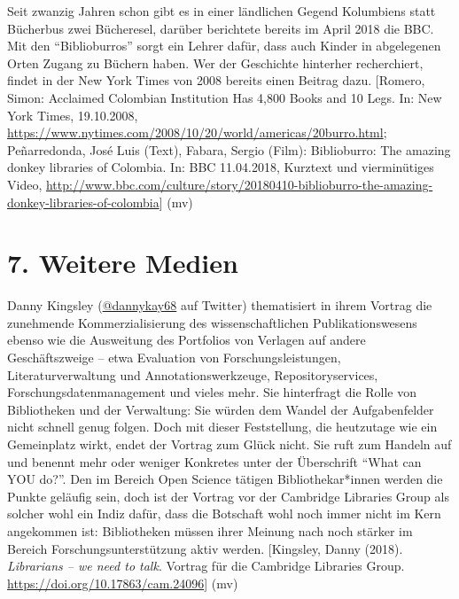 \documentclass[a4paper,
fontsize=11pt,
oneside,
numbers=noperiodatend,
parskip=half-,
bibliography=totoc,
final
]{scrartcl}
\begin{document}
Seit zwanzig Jahren schon gibt es in einer ländlichen Gegend Kolumbiens
statt Bücherbus zwei Bücheresel, darüber berichtete bereits im April
2018 die BBC. Mit den \enquote{Biblioburros} sorgt ein Lehrer dafür,
dass auch Kinder in abgelegenen Orten Zugang zu Büchern haben. Wer der
Geschichte hinterher recherchiert, findet in der New York Times von 2008
bereits einen Beitrag dazu. {[}Romero, Simon: Acclaimed Colombian
Institution Has 4,800 Books and 10 Legs. In: New York Times, 19.10.2008,
\url{https://www.nytimes.com/2008/10/20/world/americas/20burro.html};
Peñarredonda, José Luis (Text), Fabara, Sergio (Film): Biblioburro: The
amazing donkey libraries of Colombia. In: BBC 11.04.2018, Kurztext und
vierminütiges Video,
\url{http://www.bbc.com/culture/story/20180410-biblioburro-the-amazing-donkey-libraries-of-colombia}{]}
(mv)

\hypertarget{weitere-medien}{%
\section{7. Weitere Medien}\label{weitere-medien}}

Danny Kingsley (\href{https://twitter.com/dannykay68}{@dannykay68} auf
Twitter) thematisiert in ihrem Vortrag die zunehmende Kommerzialisierung
des wissenschaftlichen Publikationswesens ebenso wie die Ausweitung des
Portfolios von Verlagen auf andere Geschäftszweige -- etwa Evaluation
von Forschungsleistungen, Literaturverwaltung und Annotationswerkzeuge,
Repositoryservices, Forschungsdatenmanagement und vieles mehr. Sie
hinterfragt die Rolle von Bibliotheken und der Verwaltung: Sie würden
dem Wandel der Aufgabenfelder nicht schnell genug folgen. Doch mit
dieser Feststellung, die heutzutage wie ein Gemeinplatz wirkt, endet der
Vortrag zum Glück nicht. Sie ruft zum Handeln auf und benennt mehr oder
weniger Konkretes unter der Überschrift \enquote{What can YOU do?}. Den
im Bereich Open Science tätigen Bibliothekar*in\-nen werden die Punkte
geläufig sein, doch ist der Vortrag vor der Cambridge Libraries Group
als solcher wohl ein Indiz dafür, dass die Botschaft wohl noch immer
nicht im Kern angekommen ist: Bibliotheken müssen ihrer Meinung nach
noch stärker im Bereich Forschungsunterstützung aktiv werden.
{[}Kingsley, Danny (2018). \emph{Librarians -- we need to talk}. Vortrag
für die Cambridge Libraries Group.
\url{https://doi.org/10.17863/cam.24096}{]} (mv)
\end{document}
